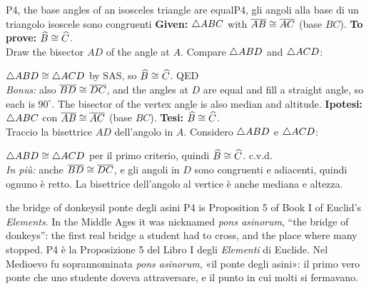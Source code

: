 \begin{proofbox}{P4, the base angles of an isosceles triangle are equal}{P4, gli angoli alla base di un triangolo isoscele sono congruenti}
\textbf{Given:} $\triangle ABC$ with $\overline{AB} \cong \overline{AC}$ (base $BC$). \textbf{To prove:} $\widehat{B} \cong \widehat{C}$.\\
Draw the bisector $AD$ of the angle at $A$. Compare $\triangle ABD$ and $\triangle ACD$:
\begin{steps}
\end{steps}
$\triangle ABD \cong \triangle ACD$ by SAS, so $\widehat{B} \cong \widehat{C}$. \hfill QED\\
\emph{Bonus:} also $\overline{BD} \cong \overline{DC}$, and the angles at $D$ are equal and fill a straight angle, so each is $90^\circ$. The bisector of the vertex angle is also median and altitude.
\tcblower
\textbf{Ipotesi:} $\triangle ABC$ con $\overline{AB} \cong \overline{AC}$ (base $BC$). \textbf{Tesi:} $\widehat{B} \cong \widehat{C}$.\\
Traccio la bisettrice $AD$ dell'angolo in $A$. Considero $\triangle ABD$ e $\triangle ACD$:
\begin{steps}
\end{steps}
$\triangle ABD \cong \triangle ACD$ per il primo criterio, quindi $\widehat{B} \cong \widehat{C}$. \hfill c.v.d.\\
\emph{In più:} anche $\overline{BD} \cong \overline{DC}$, e gli angoli in $D$ sono congruenti e adiacenti, quindi ognuno è retto. La bisettrice dell'angolo al vertice è anche mediana e altezza.
\end{proofbox}

\begin{history}{the bridge of donkeys}{il ponte degli asini}
P4 is Proposition 5 of Book I of Euclid's \emph{Elements}. In the Middle Ages it was nicknamed \emph{pons asinorum}, ``the bridge of donkeys'': the first real bridge a student had to cross, and the place where many stopped.
\tcblower
P4 è la Proposizione 5 del Libro I degli \emph{Elementi} di Euclide. Nel Medioevo fu soprannominata \emph{pons asinorum}, «il ponte degli asini»: il primo vero ponte che uno studente doveva attraversare, e il punto in cui molti si fermavano.
\end{history}


